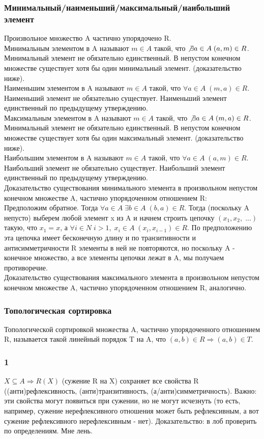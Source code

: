 \subsubsection{Минимальный/наименьший/максимальный/наибольший элемент}
Произвольное множество A частично упорядочено R.\\
Минимальным элементом в A называют $m \in A$ такой, что $\not\exists a \in A \; (a, m) \in R$. Минимальный элемент не обязательно единственный. В непустом конечном множестве существует хотя бы один минимальный элемент. (доказательство ниже).\\
Наименьшим элементом в A называют $m \in A$ такой, что $\forall a \in A \; (m, a) \in R$. Наименьший элемент не обязательно существует. Наименьший элемент единственный по предыдущему утверждению.\\
Максимальным элементом в A называют $m \in A$ такой, что $\not\exists a \in A \; (m, a) \in R$. Минимальный элемент не обязательно единственный. В непустом конечном множестве существует хотя бы один максимальный элемент. (доказательство ниже).\\
Наибольшим элементом в A называют $m \in A$ такой, что $\forall a \in A \; (a, m) \in R$. Наибольший элемент не обязательно существует. Наибольший элемент единственный по предыдущему утверждению.\\
Доказательство существования минимального элемента в произвольном непустом конечном множестве A, частично упорядоченном отношением R: \\
Предположим обратное. Тогда $\forall a \in A \; \exists b \in A \; (b, a) \in R$. Тогда (поскольку A непусто) выберем любой элемент x из A и начнем строить цепочку $(x_1, x_2, \; ...)$ такую, что $x_1 = x$, а $\forall i \in N \; i > 1, \; x_i \in A \; (x_i, x_{i - 1}) \in R$. По предположению эта цепочка имеет бесконечную длину и по транзитивности и антисимметричности R элементы в ней не повторяются, но поскольку A - конечное множество, а все элементы цепочки лежат в A, мы получаем противоречие.\\
Доказательство существования максимального элемента в произвольном непустом конечном множестве A, частично упорядоченном отношением R, аналогично.
\subsubsection{Топологическая сортировка}
Топологической сортировкой множества A, частично упорядоченного отношением R, называется такой линейный порядок T на A, что $(a, b) \in R \Rightarrow (a, b) \in T$.\\
\subsubsection{1}
$X \subseteq A \Rightarrow R(X)$ (сужение R на X) сохраняет все свойства R ((анти)рефлексивность, (анти)транзитивность, (а/анти)симметричность). Важно: эти свойства могут появиться при сужении, но не могут исчезнуть (то есть, например, сужение нерефлексивного отношения может быть рефлексивным, а вот сужение рефлексивного нерефлексивным - нет). Доказательство: в лоб проверить по определениям. Мне лень. \\